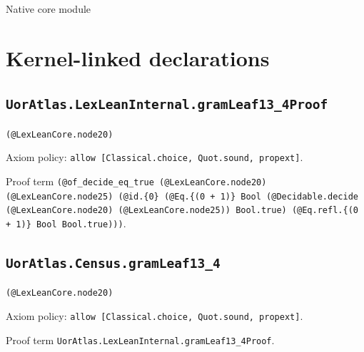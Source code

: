\documentclass[11pt]{article}
\begin{document}
\begin{center}{\LARGE Native core module}\end{center}
\section*{Kernel-linked declarations}
\subsection*{\texttt{UorAtlas.LexLeanInternal.gramLeaf13\_4Proof}}
\noindent\texttt{(@LexLeanCore.node20)}\par
\noindent Axiom policy: \texttt{allow [Classical.choice, Quot.sound, propext]}.\par
\noindent Proof term \texttt{(@of\_decide\_eq\_true (@LexLeanCore.node20) (@LexLeanCore.node25) (@id.\{0\} (@Eq.\{(0 + 1)\} Bool (@Decidable.decide (@LexLeanCore.node20) (@LexLeanCore.node25)) Bool.true) (@Eq.refl.\{(0 + 1)\} Bool Bool.true)))}.\par
\subsection*{\texttt{UorAtlas.Census.gramLeaf13\_4}}
\noindent\texttt{(@LexLeanCore.node20)}\par
\noindent Axiom policy: \texttt{allow [Classical.choice, Quot.sound, propext]}.\par
\noindent Proof term \texttt{UorAtlas.LexLeanInternal.gramLeaf13\_4Proof}.\par
\end{document}
